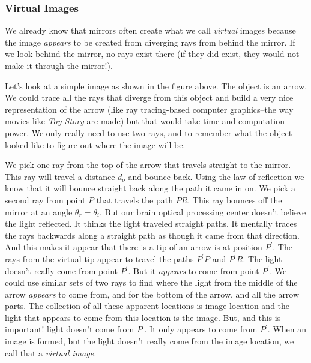 \documentclass{article}
\begin{document}
\subsubsection{Virtual Images}

We already know that mirrors often create what we call \emph{virtual} images
because the image \emph{appears} to be created from diverging rays from
behind the mirror. If we look behind the mirror, no rays exist there (if
they did exist, they would not make it through the mirror!).


Let's look at a simple image as shown in the figure above. The object is an
arrow. We could trace all the rays that diverge from this object and build a
very nice representation of the arrow (like ray tracing-based computer
graphics--the way movies like \emph{Toy Story} are made) but that would take
time and computation power. We only really need to use two rays, and to
remember what the object looked like to figure out where the image will be.

We pick one ray from the top of the arrow that travels straight to the
mirror. This ray will travel a distance $d_{o}$ and bounce back. Using the
law of reflection we know that it will bounce straight back along the path
it came in on. We pick a second ray from point $P$ that travels the path $%
PR. $ This ray bounces off the mirror at an angle $\theta _{r}=\theta _{i}.$
But our brain optical processing center doesn't believe the light reflected.
It thinks the light traveled straight paths. It mentally traces the rays
backwards along a straight path as though it came from that direction. And
this makes it appear that there is a tip of an arrow is at position $%
P^{\prime }.$ The rays from the virtual tip appear to travel the paths $%
P^{\prime }P$ and $P^{\prime }R.$ The light doesn't really come from point $%
P^{\prime }.$ But it \emph{appears} to come from point $P^{\prime }$. We
could use similar sets of two rays to find where the light from the middle
of the arrow \emph{appears} to come from, and for the bottom of the arrow,
and all the arrow parts. The collection of all these apparent locations is
image location and the light that appears to come from this location is the
image. But, and this is important! light doesn't come from $P^{\prime }.$ It
only appears to come from $P^{\prime }.$ When an image is formed, but the
light doesn't really come from the image location, we call that a \emph{%
virtual image.}
\end{document}
